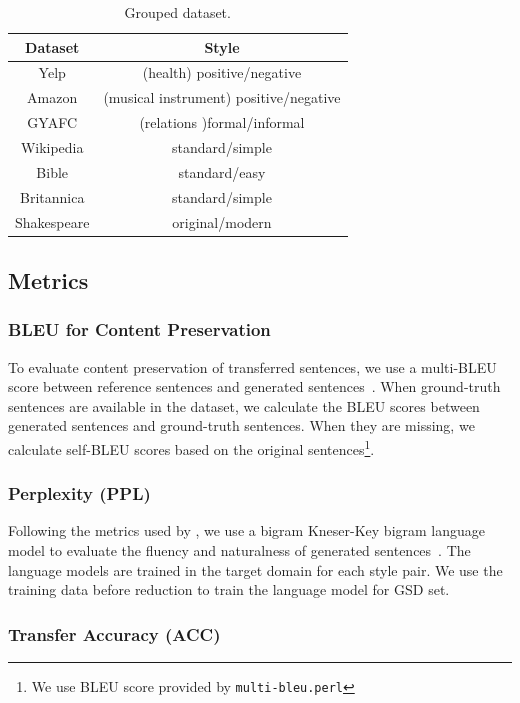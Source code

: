 \begin{table}[th]\footnotesize
	\centering
	\begin{tabular}{cc}
		\hline
		\textbf{Dataset} & \textbf{Style} \\
		\hline
		Yelp & (health) positive/negative \\
		Amazon & (musical instrument) positive/negative \\
		GYAFC & (relations )formal/informal \\
		Wikipedia & standard/simple \\
		Bible & standard/easy \\
		Britannica & standard/simple \\
		Shakespeare & original/modern \\
		\hline
	\end{tabular}
	\caption{Grouped dataset.}\label{tb:data2}
\end{table}


\subsection{Metrics}
\subsubsection*{BLEU for Content Preservation}

To evaluate content preservation of transferred sentences, we use a multi-BLEU score between reference sentences and generated sentences~\cite{papineni2002bleu}. When ground-truth sentences are available in the dataset, we calculate the BLEU scores between generated sentences and ground-truth sentences. When they are missing, we calculate self-BLEU scores based on the original sentences\footnote{We use BLEU score provided by \texttt{multi-bleu.perl}}.

\subsubsection*{Perplexity (PPL)}

Following the metrics used by \citet{john2018disentangled}, we use a bigram Kneser-Key bigram language model to evaluate the fluency and naturalness of generated sentences~\cite{kneser1995improved}. The language models are trained in the target domain for each style pair. We use the training data before reduction to train the language model for GSD set.


\subsubsection*{Transfer Accuracy (ACC)}

